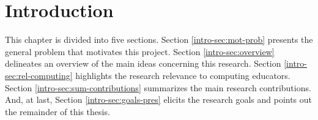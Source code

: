 \chapter{Introduction}
\label{chap:intro}

This chapter is divided into five sections. Section \ref{intro-sec:mot-prob} presents the general problem that motivates this project. Section \ref{intro-sec:overview} delineates an overview of the main ideas concerning this research. Section \ref{intro-sec:rel-computing} highlights the research relevance to computing educators. Section \ref{intro-sec:sum-contributions} summarizes the main research contributions. And, at last, Section \ref{intro-sec:goals-pres} elicits the research goals and points out the remainder of this thesis.